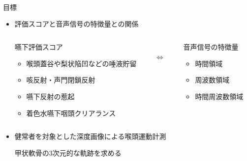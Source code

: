 \documentclass[10pt]{beamer}
\begin{document}
\begin{frame}{目標}
  \begin{itemize}
  \item<1-> 評価スコアと音声信号の特徴量との関係

    \begin{columns}[t]
      \begin{column}{0.4\textwidth}
        \begin{itembox}[l]{嚥下評価スコア}
          \begin{itemize}
          \item 喉頭蓋谷や梨状陥凹などの唾液貯留
          \item 咳反射・声門閉鎖反射
          \item 嚥下反射の惹起
          \item 着色水嚥下咽頭クリアランス
          \end{itemize}
        \end{itembox}
      \end{column}
      \begin{column}{0.05\textwidth}
        \mbox{}\\[3zw]
        $\Longleftrightarrow$ 
      \end{column}
      \begin{column}{0.4\textwidth}
        \begin{itembox}[l]{音声信号の特徴量}
          \begin{itemize}
          \item 時間領域
          \item 周波数領域
          \item 時間周波数領域
          \end{itemize}
        \end{itembox}
      \end{column}
    \end{columns}
    
    
  \item<2-> 健常者を対象とした深度画像による喉頭運動計測

    甲状軟骨の3次元的な軌跡を求める
  \end{itemize}
\end{frame}
\end{document}
